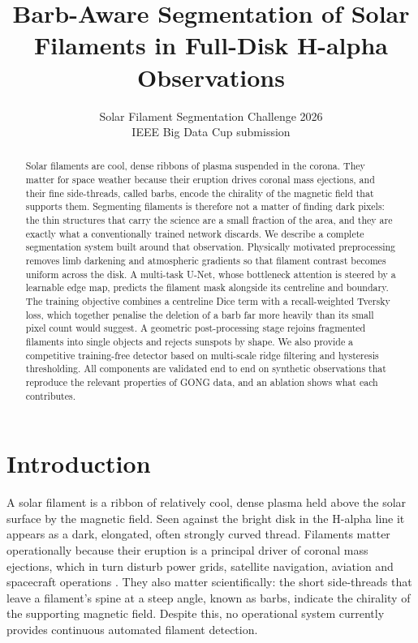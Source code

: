 \documentclass[11pt]{article}
\title{Barb-Aware Segmentation of Solar Filaments in Full-Disk H-alpha Observations}
\author{Solar Filament Segmentation Challenge 2026 \\ IEEE Big Data Cup submission}
\begin{document}
\maketitle

\begin{abstract}
Solar filaments are cool, dense ribbons of plasma suspended in the corona.
They matter for space weather because their eruption drives coronal mass
ejections, and their fine side-threads, called barbs, encode the chirality of
the magnetic field that supports them. Segmenting filaments is therefore not a
matter of finding dark pixels: the thin structures that carry the science are a
small fraction of the area, and they are exactly what a conventionally trained
network discards. We describe a complete segmentation system built around that
observation. Physically motivated preprocessing removes limb darkening and
atmospheric gradients so that filament contrast becomes uniform across the
disk. A multi-task U-Net, whose bottleneck attention is steered by a learnable
edge map, predicts the filament mask alongside its centreline and boundary.
The training objective combines a centreline Dice term with a recall-weighted
Tversky loss, which together penalise the deletion of a barb far more heavily
than its small pixel count would suggest. A geometric post-processing stage
rejoins fragmented filaments into single objects and rejects sunspots by shape.
We also provide a competitive training-free detector based on multi-scale ridge
filtering and hysteresis thresholding. All components are validated end to end
on synthetic observations that reproduce the relevant properties of GONG data,
and an ablation shows what each contributes.
\end{abstract}

\section{Introduction}

A solar filament is a ribbon of relatively cool, dense plasma held above the
solar surface by the magnetic field. Seen against the bright disk in the
H-alpha line it appears as a dark, elongated, often strongly curved thread.
Filaments matter operationally because their eruption is a principal driver of
coronal mass ejections, which in turn disturb power grids, satellite
navigation, aviation and spacecraft operations \cite{mackay2010}. They also
matter scientifically: the short side-threads that leave a filament's spine at
a steep angle, known as barbs, indicate the chirality of the supporting
magnetic field. Despite this, no operational system currently provides
continuous automated filament detection.
\end{document}

